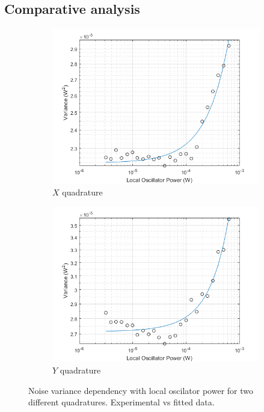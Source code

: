 \subsection{Comparative analysis}
%
%
\begin{figure}[H]
    \begin{subfigure}{.5\textwidth}
        \centering
        \includegraphics[width=.8\linewidth]{./sdf/quantum_noise/figures/noise_exp_channel1.png}
        \caption{$X$ quadrature}
        \label{fig:noise-exp-1}
    \end{subfigure}%
    \begin{subfigure}{.5\textwidth}
        \centering
        \includegraphics[width=.8\linewidth]{./sdf/quantum_noise/figures/noise_exp_channel3.png}
        \caption{$Y$ quadrature}
        \label{fig:noise-exp-3}
    \end{subfigure}
    \captionsetup{justification=centering}
    \caption{Noise variance dependency with local oscilator power for two different quadratures. Experimental vs fitted data.}
\end{figure}
